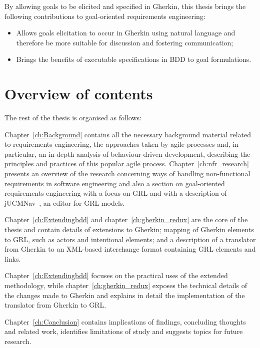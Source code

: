 \documentclass[dissertation,final]{softeng}
\begin{document}
By allowing goals to be elicited and specified in Gherkin, this thesis brings the following contributions to goal-oriented requirements engineering:

\begin{center}
\begin{itemize}
\item Allows goals elicitation to occur in Gherkin using natural language and therefore be more suitable for discussion and fostering communication;
\item Brings the benefits of executable specifications in BDD to goal formulations.
\end{itemize}
\end{center}


\section{Overview of contents}

The rest of the thesis is organised as follows:

Chapter~\ref{ch:Background} contains all the necessary background material related to requirements engineering, the approaches taken by agile processes and, in particular, an in-depth analysis of behaviour-driven development, describing the principles and practices of this popular agile process. Chapter~\ref{ch:nfr_research} presents an overview of the research concerning ways of handling non-functional requirements in software engineering and also a section on goal-oriented requirements engineering with a focus on GRL and with a description of jUCMNav~\citep{Amyot2010}, an editor for GRL models.

Chapter~\ref{ch:Extendingbdd} and chapter~\ref{ch:gherkin_redux} are the core of the thesis and contain details of extensions to Gherkin; mapping of Gherkin elements to GRL, such as actors and intentional elements; and a description of a translator from Gherkin to an XML-based interchange format containing GRL elements and links.

Chapter~\ref{ch:Extendingbdd} focuses on the practical uses of the extended methodology, while chapter~\ref{ch:gherkin_redux} exposes the technical details of the changes made to Gherkin and explains in detail the implementation of the translator from Gherkin to GRL.

Chapter~\ref{ch:Conclusion} contains implications of findings, concluding thoughts and related work, identifies limitations of study and suggests topics for future research.
\end{document}
